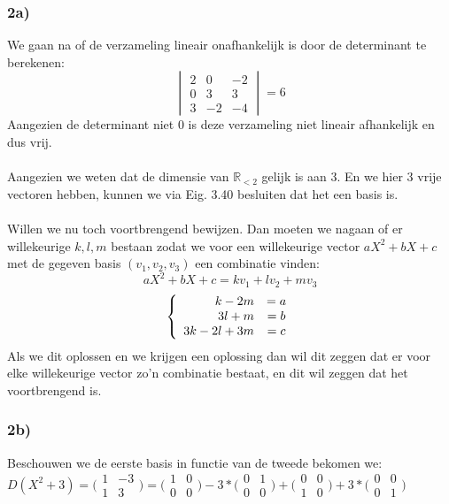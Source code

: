 \documentclass[lineaire_algebra_oplossingen.tex]{subfiles}
\begin{document}
\subsubsection*{2a)}
We gaan na of de verzameling lineair onafhankelijk is door de determinant te berekenen:
$$
\begin{vmatrix}
2 & 0 & -2\\
0&3&3\\
3&-2&-4
\end{vmatrix}
= 6
$$
Aangezien de determinant niet 0 is deze verzameling niet lineair afhankelijk en dus vrij.
\\
\\
Aangezien we weten dat de dimensie van $\mathbb{R}_{<2}$ gelijk is aan 3. En we hier 3 vrije vectoren hebben, kunnen we via Eig. 3.40 besluiten dat het een basis is.
\\
\\
Willen we nu toch voortbrengend bewijzen. Dan moeten we nagaan of er willekeurige $k,l,m$ bestaan zodat we voor een willekeurige vector $aX^2+bX+c$ met de gegeven basis $(v_1,v_2,v_3)$ een combinatie vinden:
$$
aX^2+bX+c = kv_1+lv_2+mv_3
$$
$$
\left\lbrace
\begin{array}{r c}
k-2m &= a\\
3l+m &= b\\
3k-2l+3m &= c
\end{array}
\right.
$$
Als we dit oplossen en we krijgen een oplossing dan wil dit zeggen dat er voor elke willekeurige vector zo'n combinatie bestaat, en dit wil zeggen dat het voortbrengend is.
\subsubsection*{2b)}

Beschouwen we de eerste basis in functie van de tweede bekomen we:\\

$D(X^2+3) = \bigl(
\begin{smallmatrix}
1&-3\\ 1&3
\end{smallmatrix}
\bigr) = \bigl(
\begin{smallmatrix}
1&0\\ 0&0
\end{smallmatrix}
\bigr) -3* \bigl(
\begin{smallmatrix}
0&1\\ 0&0
\end{smallmatrix}
\bigr) + \bigl(
\begin{smallmatrix}
0&0\\ 1&0
\end{smallmatrix}
\bigr) +3* \bigl(
\begin{smallmatrix}
0&0\\ 0&1
\end{smallmatrix}
\bigr)$\\
\end{document}
